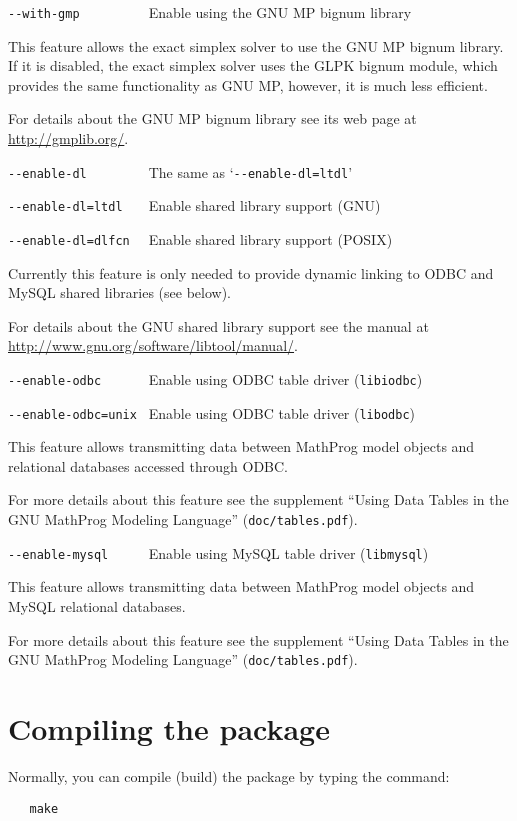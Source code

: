 \verb|--with-gmp         | Enable using the GNU MP bignum library

This feature allows the exact simplex solver to use the GNU MP bignum
library. If it is disabled, the exact simplex solver uses the GLPK
bignum module, which provides the same functionality as GNU MP, however,
it is much less efficient.

For details about the GNU MP bignum library see its web page at
\url{http://gmplib.org/}.

\verb|--enable-dl        | The same as `\verb|--enable-dl=ltdl|'

\verb|--enable-dl=ltdl   | Enable shared library support (GNU)

\verb|--enable-dl=dlfcn  | Enable shared library support (POSIX)

Currently this feature is only needed to provide dynamic linking to
ODBC and MySQL shared libraries (see below).

For details about the GNU shared library support see the manual at
\url{http://www.gnu.org/software/libtool/manual/}.

\verb|--enable-odbc      |
Enable using ODBC table driver (\verb|libiodbc|)

\verb|--enable-odbc=unix |
Enable using ODBC table driver (\verb|libodbc|)

This feature allows transmitting data between MathProg model objects
and relational databases accessed through ODBC.

For more details about this feature see the supplement ``Using Data
Tables in the GNU MathProg Modeling Language'' (\verb|doc/tables.pdf|).

\verb|--enable-mysql     |
Enable using MySQL table driver (\verb|libmysql|)

This feature allows transmitting data between MathProg model objects
and MySQL relational databases.

For more details about this feature see the supplement ``Using Data
Tables in the GNU MathProg Modeling Language'' (\verb|doc/tables.pdf|).

\section{Compiling the package}

Normally, you can compile (build) the package by typing the command:

\begin{verbatim}
   make
\end{verbatim}

